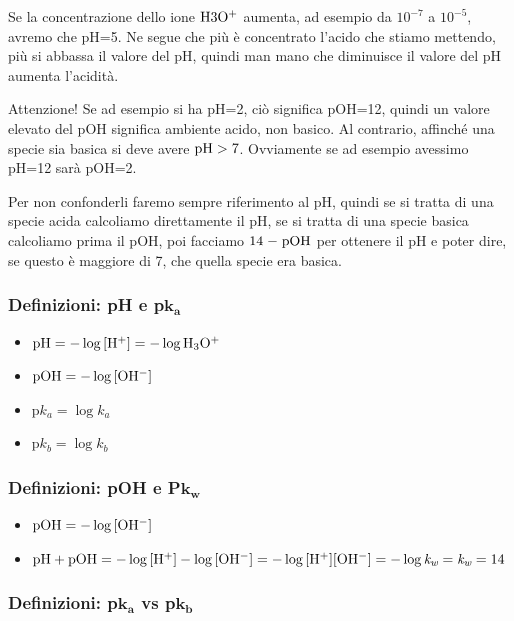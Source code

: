 Se la concentrazione dello ione $\rm H3O^+$ aumenta, ad esempio da $10^{-7}$ a $10^{-5}$, avremo che pH=5. Ne segue che più è concentrato l'acido che stiamo mettendo, più si abbassa il valore del pH, quindi man mano che diminuisce il valore del pH aumenta l'acidità.

Attenzione! Se ad esempio si ha pH=2, ciò significa pOH=12, quindi un valore elevato del pOH significa ambiente acido, non basico. Al contrario, affinché una specie sia basica si deve avere $\rm pH > 7$. Ovviamente se ad esempio avessimo pH=12 sarà pOH=2.

Per non confonderli faremo sempre riferimento al pH, quindi se si tratta di una specie acida calcoliamo direttamente il pH, se si tratta di una specie basica calcoliamo prima il pOH, poi facciamo $\rm 14 \hspace{0.2mm}-\hspace{0.2mm} pOH$ per ottenere il pH e poter dire, se questo è maggiore di 7, che quella specie era basica.

\subsubsection{Definizioni: pH e p$\boldsymbol{k_a}$}

\begin{itemize}
    \item $\rm pH=-\log{[H^+]}=-\log{H_3O^+}$
    \item $\rm pOH=-\log{[OH^-]}$
    \item $\text{p}k_a=\log{k_a}$
    \item $\text{p}k_b=\log{k_b}$
\end{itemize}

\subsubsection{Definizioni: pOH e P$\boldsymbol{k_w}$}

\begin{itemize}
    \item $\rm pOH=-\log{[OH^-]}$
    \item $\rm pH + pOH=-\log{[H^+]} - \log{[OH^-]}=-\log{[H^+][OH^-]}=-\log{\textit{k}_{\textit{w}}}=\textit{k}_{\textit{w}}=14$
\end{itemize}

\subsubsection{Definizioni: p$\boldsymbol{k_a}$ vs p$\boldsymbol{k_b}$}


